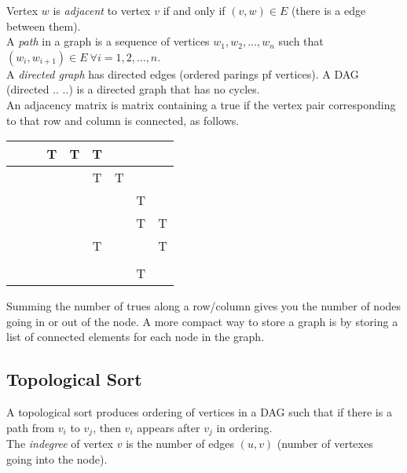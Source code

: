 \documentclass[]{article}
\begin{document}
Vertex $w$ is \textit{adjacent} to vertex $v$ if and only if $(v, w) \in E$ (there is a edge between them).\\

A \textit{path} in a graph is a sequence of vertices $w_1, w_2, ..., w_n$ such that $(w_i, w_{i+1}) \in E~\forall i = 1, 2, ..., n$.\\

A \textit{directed graph} has directed edges (ordered parings pf vertices). A DAG (directed .. ..) is a directed graph that has no cycles.\\


An adjacency matrix is matrix containing a true if the vertex pair corresponding to that row and column is connected, as follows.

\begin{table}[H]\centering
	\begin{tabular}{|c|c|c|c|c|c|c|}\hline
		~~~& T & T & T & & & \\\hline
		&   &   & T & T& & \\\hline
		&   &   &   &  & T& \\\hline
		&   &   &   &  & T&T \\\hline
		&   &   & T &  & & T\\\hline
		&   &   &   &  & & \\\hline
		&   &   &   &  & T& \\\hline
	\end{tabular}\bigbreak
\end{table}

Summing the number of trues along a row/column gives you the number of nodes going in or out of the node. A more compact way to store a graph is by storing a list of connected elements for each node in the graph.\\

\subsection{Topological Sort}\bigbreak

A topological sort produces ordering of vertices in a DAG such that if there is a path from $v_i$ to $v_j$, then $v_i$ appears after $v_j$ in ordering.\\

The \textit{indegree} of vertex $v$ is the number of edges $(u, v)$ (number of vertexes going into the node). \\
\end{document}
